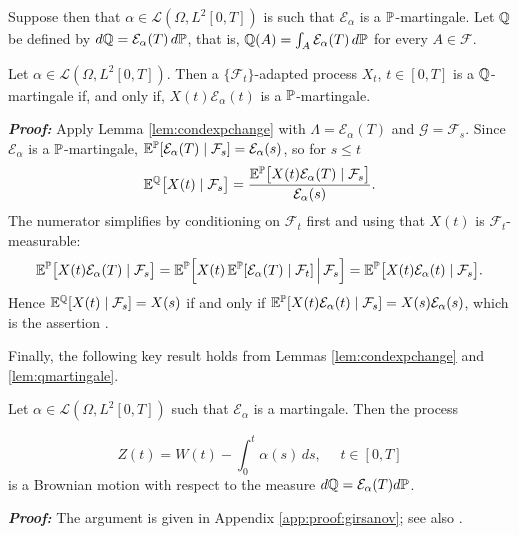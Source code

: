 Suppose then that $\alpha \in \mathcal{L}(\Omega, L^2[0,T])$ is such that $\mathcal E_\alpha$ is a $\mathbb{P}$-martingale. Let $\mathbb{Q}$ be defined by $d\mathbb{Q} = \mathcal E_\alpha(T)\,d\mathbb{P}$, that is, $\mathbb{Q}(A) = \int_A \mathcal E_\alpha (T) \, d\mathbb{P}$ for every $A\in \mathcal F$.

\begin{lemma}\label{lem:qmartingale}
Let $\alpha \in \mathcal{L}(\Omega, L^2[0,T])$.   Then a $\{\mathcal F_t \}$-adapted process $X_t$, $t\in[0,T]$ is a $\mathbb{Q}$-martingale if, and only if, $X(t) \mathcal E_\alpha(t)$  is a $\mathbb{P}$-martingale.
\end{lemma}
\textbf{\textit{Proof:}} Apply Lemma \ref{lem:condexpchange} with $\Lambda = \mathcal{E}_\alpha(T)$ and
$\mathcal{G} = \mathcal{F}_s$. Since $\mathcal{E}_\alpha$ is a $\mathbb{P}$-martingale,
$\mathbb{E}^{\mathbb{P}}[\mathcal{E}_\alpha(T)\mid\mathcal{F}_s] = \mathcal{E}_\alpha(s)$, so for
$s \leq t$
\begin{equation}
\mathbb{E}^{\mathbb{Q}}\bigl[X(t) \mid \mathcal{F}_s\bigr]
= \frac{\mathbb{E}^{\mathbb{P}}\bigl[X(t)\mathcal{E}_\alpha(T)\mid\mathcal{F}_s\bigr]}{\mathcal{E}_\alpha(s)} .
\end{equation}
The numerator simplifies by conditioning on $\mathcal{F}_t$ first and using that $X(t)$ is
$\mathcal{F}_t$-measurable:
\[
\mathbb{E}^{\mathbb{P}}\bigl[X(t)\mathcal{E}_\alpha(T)\mid\mathcal{F}_s\bigr]
= \mathbb{E}^{\mathbb{P}}\Bigl[X(t)\,\mathbb{E}^{\mathbb{P}}[\mathcal{E}_\alpha(T)\mid\mathcal{F}_t]\,\Big|\,\mathcal{F}_s\Bigr]
= \mathbb{E}^{\mathbb{P}}\bigl[X(t)\mathcal{E}_\alpha(t)\mid\mathcal{F}_s\bigr].
\]
Hence $\mathbb{E}^{\mathbb{Q}}[X(t)\mid\mathcal{F}_s] = X(s)$ if and only if
$\mathbb{E}^{\mathbb{P}}[X(t)\mathcal{E}_\alpha(t)\mid\mathcal{F}_s] = X(s)\mathcal{E}_\alpha(s)$,
which is the assertion \cite[Lemma 8.9.3]{kuo2006}. \qedfilledtext

Finally, the following key result holds from Lemmas \ref{lem:condexpchange} and \ref{lem:qmartingale}.

\begin{theorem}\label{girsanovtheorem}
Let $\alpha \in \mathcal{L}(\Omega, L^2[0,T])$ such that $\mathcal E_\alpha$ is a martingale. Then the process 

\begin{equation}
    Z(t) = W(t) - \int_0^t \alpha(s) \, ds, \text{ }\text{ } t\in[0,T]
\end{equation}
is a Brownian motion with respect to the measure $d\mathbb{Q}  = \mathcal E_\alpha (T) d\mathbb{P}$.
\end{theorem}
\textbf{\textit{Proof:}} The argument is given in Appendix \ref{app:proof:girsanov}; see also \cite[Thm.\ 8.9.4]{kuo2006}. \qedfilledtext

